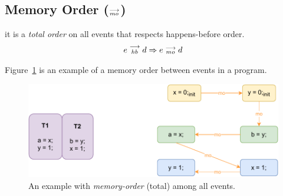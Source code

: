     \subsection{Memory Order ($\stackrel{\longrightarrow}{_{mo}}$)}
        it is a \textit{total order} on all events that respects happens-before order\footnotemark. 
        \begin{align*}
            e\stackrel{\longrightarrow}{_{hb}}d \Rightarrow{} e\stackrel{\longrightarrow}{_{mo}}d    
        \end{align*}

        
        Figure~\ref{model:memory-order} is an example of a memory order between events in a program.
        \begin{figure}[H]
            \centering
            \includegraphics[scale=0.7]{3.ECMAScriptMemoryModel/MemoryOrder.pdf}
            \caption{An example with \textit{memory-order} (total) among all events.}
            \label{model:memory-order}
        \end{figure}
